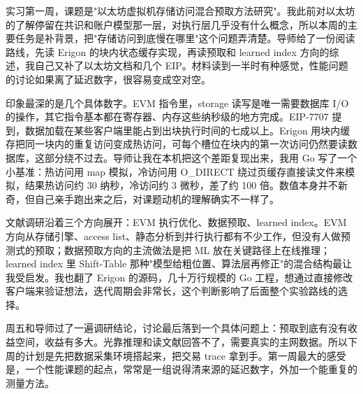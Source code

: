 \documentclass[UTF8,fontset=fandol]{ctexart}
\begin{document}

实习第一周，课题是"以太坊虚拟机存储访问混合预取方法研究"。我此前对以太坊的了解停留在共识和账户模型那一层，对执行层几乎没有什么概念，所以本周的主要任务是补背景，把"存储访问到底慢在哪里"这个问题弄清楚。导师给了一份阅读路线，先读 Erigon 的块内状态缓存实现，再读预取和 learned index 方向的综述，我自己又补了以太坊文档和几个 EIP。材料读到一半时有种感觉，性能问题的讨论如果离了延迟数字，很容易变成空对空。

印象最深的是几个具体数字。EVM 指令里，storage 读写是唯一需要数据库 I/O 的操作，其它指令基本都在寄存器、内存这些纳秒级的地方完成。EIP-7707 提到，数据加载在某些客户端里能占到出块执行时间的七成以上。Erigon 用块内缓存把同一块内的重复访问变成热访问，可每个槽位在块内的第一次访问仍然要读数据库，这部分绕不过去。导师让我在本机把这个差距复现出来，我用 Go 写了一个小基准：热访问用 map 模拟，冷访问用 O_DIRECT 绕过页缓存直接读文件来模拟，结果热访问约 30 纳秒，冷访问约 3 微秒，差了约 100 倍。数值本身并不新奇，但自己亲手跑出来之后，对课题动机的理解确实不一样了。

文献调研沿着三个方向展开：EVM 执行优化、数据预取、learned index。EVM 方向从存储引擎、access list、静态分析到并行执行都有不少工作，但没有人做预测式的预取；数据预取方向的主流做法是把 ML 放在关键路径上在线推理；learned index 里 Shift-Table 那种"模型给粗位置、算法层再修正"的混合结构最让我受启发。我也翻了 Erigon 的源码，几十万行规模的 Go 工程，想通过直接修改客户端来验证想法，迭代周期会非常长，这个判断影响了后面整个实验路线的选择。

周五和导师过了一遍调研结论，讨论最后落到一个具体问题上：预取到底有没有收益空间，收益有多大。光靠推理和读文献回答不了，需要真实的主网数据。所以下周的计划是先把数据采集环境搭起来，把交易 trace 拿到手。第一周最大的感受是，一个性能课题的起点，常常是一组说得清来源的延迟数字，外加一个能重复的测量方法。
\end{document}
